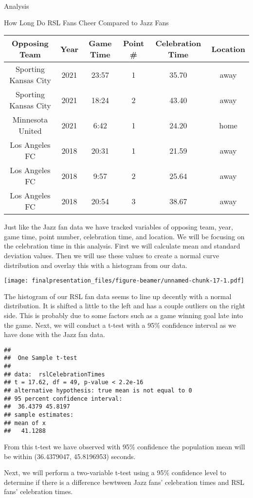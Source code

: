 \documentclass[
  ignorenonframetext,
]{beamer}
\begin{document}
\begin{frame}[fragile]{Analysis}
\begin{block}{How Long Do RSL Fans Cheer Compared to Jazz Fans}
\begin{table}
\centering
\begin{tabular}{c|c|c|c|c|c}
\hline
Opposing Team & Year & Game Time & Point \# & Celebration  Time & Location\\
\hline
Sporting Kansas City & 2021 & 23:57 & 1 & 35.70 & away\\
\hline
Sporting Kansas City & 2021 & 18:24 & 2 & 43.40 & away\\
\hline
Minnesota United & 2021 & 6:42 & 1 & 24.20 & home\\
\hline
Los Angeles FC & 2018 & 20:31 & 1 & 21.59 & away\\
\hline
Los Angeles FC & 2018 & 9:57 & 2 & 25.64 & away\\
\hline
Los Angeles FC & 2018 & 20:54 & 3 & 38.67 & away\\
\hline
\end{tabular}
\end{table}

Just like the Jazz fan data we have tracked variables of opposing team,
year, game time, point number, celebration time, and location. We will
be focusing on the celebration time in this analysis. First we will
calculate mean and standard deviation values. Then we will use these
values to create a normal curve distribution and overlay this with a
histogram from our data.

\texttt{[image: finalpresentation\_files/figure-beamer/unnamed-chunk-17-1.pdf]}

The histogram of our RSL fan data seems to line up decently with a
normal distribution. It is shifted a little to the left and has a couple
outliers on the right side. This is probably due to some factors such as
a game winning goal late into the game. Next, we will conduct a t-test
with a 95\% confidence interval as we have done with the Jazz fan data.

\begin{verbatim}
## 
##  One Sample t-test
## 
## data:  rslCelebrationTimes
## t = 17.62, df = 49, p-value < 2.2e-16
## alternative hypothesis: true mean is not equal to 0
## 95 percent confidence interval:
##  36.4379 45.8197
## sample estimates:
## mean of x 
##   41.1288
\end{verbatim}

From this t-test we have observed with 95\% confidence the population
mean will be within (36.4379047, 45.8196953) seconds.

Next, we will perform a two-variable t-test using a 95\% confidence
level to determine if there is a difference bewtween Jazz fans'
celebration times and RSL fans' celebration times.


\end{block}
\end{frame}
\end{document}
